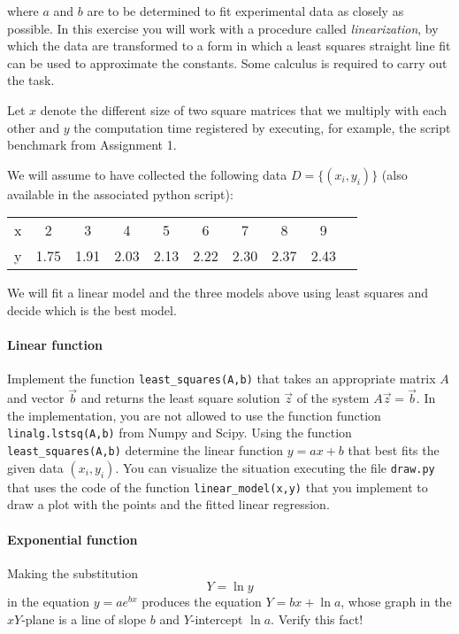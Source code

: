 \documentclass[a4paper,10pt]{article}
\begin{document}
where $a$ and $b$ are to be determined to fit experimental data as
closely as possible. In this exercise you will work with a procedure
called \emph{linearization}, by which the data are transformed to a form
in which a least squares straight line fit can be used to approximate
the constants. Some calculus is required to carry out the task.


Let $x$ denote the different size of two square matrices that we
multiply with each other and $y$ the computation time registered by
executing, for example, the script benchmark from Assignment 1.

We will assume to have collected the following data $D=\{(x_i,y_i)\}$
(also available in the associated python script):

\begin{table}[h]
  \centering
  \begin{tabular}{l|*{9}{c}}
    x&2&3&4&5&6&7&8&9\\
    y&1.75&1.91&2.03&2.13&2.22&2.30&2.37&2.43
  \end{tabular}
\end{table}
    
We will fit a linear model and the three models above using least
squares and decide which is the best model.



\paragraph{Linear function} Implement the function
\lstinline{least_squares(A,b)} that takes an appropriate matrix $A$ and
vector $\vec b$ and returns the least square solution $\vec z$ of the
system $A\vec z=\vec b$. In the implementation, you are not allowed to
use the function function \lstinline{linalg.lstsq(A,b)} from Numpy and
Scipy.  Using the function \lstinline{least_squares(A,b)} determine the
linear function $y=ax + b$ that best fits the given data $(x_i,y_i)$.
You can visualize the situation executing the file \lstinline{draw.py}
that uses the code of the function \lstinline{linear_model(x,y)} that
you implement to draw a plot with the points and the fitted linear
regression.

\paragraph{Exponential function}
Making the substitution \[Y=\ln y\] in the equation $y=ae^{bx}$ produces the
equation $Y=bx+\ln a$, whose graph in the $xY$-plane is a line of slope
$b$ and $Y$-intercept $\ln a$.  Verify this fact!
\end{document}
